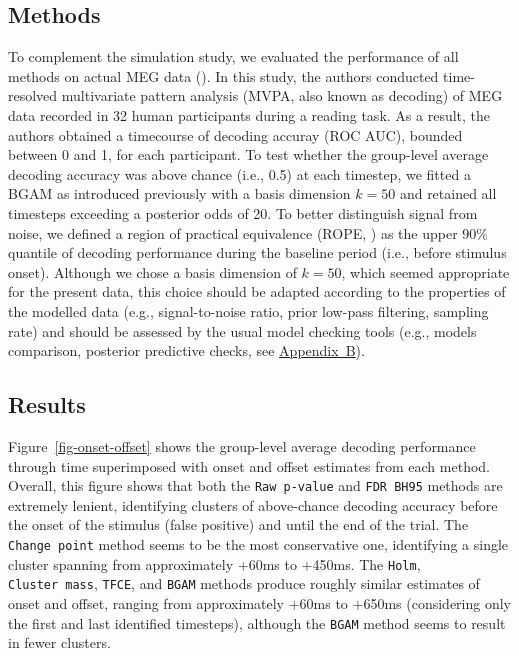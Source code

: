 \documentclass[
  doc,
  floatsintext,
  longtable,
  a4paper,
  nolmodern,
  notxfonts,
  notimes,
  colorlinks=true,linkcolor=blue,citecolor=blue,urlcolor=blue]{apa7}
\begin{document}
\subsection{Methods}\label{methods-1}

To complement the simulation study, we evaluated the performance of all
methods on actual MEG data (). In this study, the authors conducted
time-resolved multivariate pattern analysis (MVPA, also known as
decoding) of MEG data recorded in 32 human participants during a reading
task. As a result, the authors obtained a timecourse of decoding accuray
(ROC AUC), bounded between 0 and 1, for each participant. To test
whether the group-level average decoding accuracy was above chance
(i.e., 0.5) at each timestep, we fitted a BGAM as introduced previously
with a basis dimension \(k=50\) and retained all timesteps exceeding a
posterior odds of 20. To better distinguish signal from noise, we
defined a region of practical equivalence (ROPE,
) as the upper
90\% quantile of decoding performance during the baseline period (i.e.,
before stimulus onset). Although we chose a basis dimension of \(k=50\),
which seemed appropriate for the present data, this choice should be
adapted according to the properties of the modelled data (e.g.,
signal-to-noise ratio, prior low-pass filtering, sampling rate) and
should be assessed by the usual model checking tools (e.g., models
comparison, posterior predictive checks, see
\hyperref[apx-basis]{Appendix~B}).

\subsection{Results}\label{results-1}

Figure~\ref{fig-onset-offset} shows the group-level average decoding
performance through time superimposed with onset and offset estimates
from each method. Overall, this figure shows that both the
\texttt{Raw\ p-value} and \texttt{FDR\ BH95} methods are extremely
lenient, identifying clusters of above-chance decoding accuracy before
the onset of the stimulus (false positive) and until the end of the
trial. The \texttt{Change\ point} method seems to be the most
conservative one, identifying a single cluster spanning from
approximately +60ms to +450ms. The \texttt{Holm},
\texttt{Cluster\ mass}, \texttt{TFCE}, and \texttt{BGAM} methods produce
roughly similar estimates of onset and offset, ranging from
approximately +60ms to +650ms (considering only the first and last
identified timesteps), although the \texttt{BGAM} method seems to result
in fewer clusters.
\end{document}
